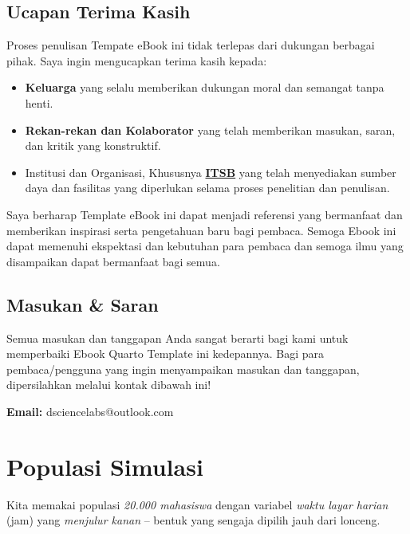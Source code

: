\documentclass[
  indonesian,
  letterpaper,
]{book}
\providecommand{\tightlist}{%
  \setlength{\itemsep}{0pt}\setlength{\parskip}{0pt}}
\begin{document}
\section*{Ucapan Terima Kasih}\label{ucapan-terima-kasih}


Proses penulisan Tempate eBook ini tidak terlepas dari dukungan berbagai
pihak. Saya ingin mengucapkan terima kasih kepada:

\begin{itemize}
\tightlist
\item
  \textbf{Keluarga} yang selalu memberikan dukungan moral dan semangat
  tanpa henti.
\item
  \textbf{Rekan-rekan dan Kolaborator} yang telah memberikan masukan,
  saran, dan kritik yang konstruktif.
\item
  Institusi dan Organisasi, Khususnya
  \textbf{\href{https://itsb.ac.id/}{ITSB}} yang telah menyediakan
  sumber daya dan fasilitas yang diperlukan selama proses penelitian dan
  penulisan.
\end{itemize}

Saya berharap Template eBook ini dapat menjadi referensi yang bermanfaat
dan memberikan inspirasi serta pengetahuan baru bagi pembaca. Semoga
Ebook ini dapat memenuhi ekspektasi dan kebutuhan para pembaca dan
semoga ilmu yang disampaikan dapat bermanfaat bagi semua.

\section*{Masukan \& Saran}\label{masukan-saran}


Semua masukan dan tanggapan Anda sangat berarti bagi kami untuk
memperbaiki Ebook Quarto Template ini kedepannya. Bagi para
pembaca/pengguna yang ingin menyampaikan masukan dan tanggapan,
dipersilahkan melalui kontak dibawah ini!

\textbf{Email:} dsciencelabs@outlook.com


\chapter{Populasi Simulasi}\label{populasi-simulasi}

Kita memakai populasi \emph{20.000 mahasiswa} dengan variabel
\emph{waktu layar harian} (jam) yang \emph{menjulur kanan} -- bentuk
yang sengaja dipilih jauh dari lonceng.
\end{document}
